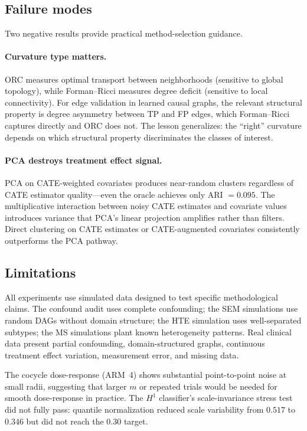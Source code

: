 \documentclass[11pt]{article}
\begin{document}
\subsection{Failure modes}

Two negative results provide practical method-selection guidance.

\paragraph{Curvature type matters.}
ORC measures optimal transport between neighborhoods (sensitive to global topology), while Forman--Ricci measures degree deficit (sensitive to local connectivity).
For edge validation in learned causal graphs, the relevant structural property is degree asymmetry between TP and FP edges, which Forman--Ricci captures directly and ORC does not.
The lesson generalizes: the ``right'' curvature depends on which structural property discriminates the classes of interest.

\paragraph{PCA destroys treatment effect signal.}
PCA on CATE-weighted covariates produces near-random clusters regardless of CATE estimator quality---even the oracle achieves only ARI $= 0.095$.
The multiplicative interaction between noisy CATE estimates and covariate values introduces variance that PCA's linear projection amplifies rather than filters.
Direct clustering on CATE estimates or CATE-augmented covariates consistently outperforms the PCA pathway.

\subsection{Limitations}

All experiments use simulated data designed to test specific methodological claims.
The confound audit uses complete confounding; the SEM simulations use random DAGs without domain structure; the HTE simulation uses well-separated subtypes; the MS simulations plant known heterogeneity patterns.
Real clinical data present partial confounding, domain-structured graphs, continuous treatment effect variation, measurement error, and missing data.

The cocycle dose-response (ARM~4) shows substantial point-to-point noise at small radii, suggesting that larger $m$ or repeated trials would be needed for smooth dose-response in practice.
The $H^1$ classifier's scale-invariance stress test did not fully pass: quantile normalization reduced scale variability from $0.517$ to $0.346$ but did not reach the $0.30$ target.
\end{document}
